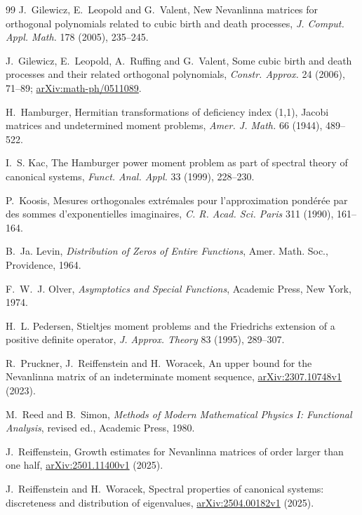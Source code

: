\begin{thebibliography}{99}
J.~Gilewicz, E.~Leopold and G.~Valent, New Nevanlinna matrices for orthogonal polynomials
related to cubic birth and death processes, \emph{J. Comput. Appl. Math.} 178 (2005), 235--245.

J.~Gilewicz, E.~Leopold, A.~Ruffing and G.~Valent, Some cubic birth and death processes and
their related orthogonal polynomials, \emph{Constr. Approx.} 24 (2006), 71--89;
\href{https://arxiv.org/abs/math-ph/0511089}{arXiv:math-ph/0511089}.

H.~Hamburger, Hermitian transformations of deficiency index (1,1), Jacobi matrices and
undetermined moment problems, \emph{Amer. J. Math.} 66 (1944), 489--522.

\enlargethispage{\baselineskip}
I.~S. Kac, The Hamburger power moment problem as part of spectral theory of canonical
systems, \emph{Funct. Anal. Appl.} 33 (1999), 228--230.

P.~Koosis, Mesures orthogonales extr\'emales pour l'approximation pond\'er\'ee par des sommes
d'exponentielles imaginaires, \emph{C. R. Acad. Sci. Paris} 311 (1990), 161--164.

B.~Ja. Levin, \emph{Distribution of Zeros of Entire Functions}, Amer. Math. Soc., Providence,
1964.

F.~W.~J. Olver, \emph{Asymptotics and Special Functions}, Academic Press, New York, 1974.

H.~L. Pedersen, Stieltjes moment problems and the Friedrichs extension of a positive definite
operator, \emph{J. Approx. Theory} 83 (1995), 289--307.

R.~Pruckner, J.~Reiffenstein and H.~Woracek, An upper bound for the Nevanlinna matrix of an
indeterminate moment sequence, \href{https://arxiv.org/abs/2307.10748}{arXiv:2307.10748v1} (2023).

M.~Reed and B.~Simon, \emph{Methods of Modern Mathematical Physics I: Functional Analysis},
revised ed., Academic Press, 1980.

J.~Reiffenstein, Growth estimates for Nevanlinna matrices of order larger than one half,
\href{https://arxiv.org/abs/2501.11400}{arXiv:2501.11400v1} (2025).

J.~Reiffenstein and H.~Woracek, Spectral properties of canonical systems: discreteness and
distribution of eigenvalues, \href{https://arxiv.org/abs/2504.00182}{arXiv:2504.00182v1} (2025).


\end{thebibliography}

